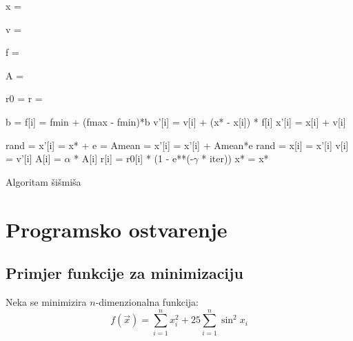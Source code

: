 \begin{algorithm}[H]
	\begin{algorithmic}[1]
		
\State x = 

\State v = 

\State f = 
  
\State A = 
  
  \State r0 = r =  

  
  
                
                \State b = 
                \State f[i] = fmin + (fmax - fmin)*b
                \State v'[i] = v[i] + (x* - x[i]) * f[i]
                \State x'[i] = x[i] + v[i] 

                \State rand = 
                \State x'[i] = x* + 
                \EndIf
                \State e = 
                \State Amean =  
                \State x'[i] = x'[i] + Amean*e 
                \State rand = 
                    \State x[i] = x'[i] 
                    \State v[i] = v'[i]
                    \State A[i] = $\alpha$ * A[i]
                    \State r[i] = r0[i] * (1 - e**(-$\gamma$ * iter))
                \EndIf
                \EndFor
		\State x* = 
		\EndFor
		\State \Return x*	
		\EndFunction
	\end{algorithmic}
	\caption{Algoritam šišmiša}
\end{algorithm}







\section{Programsko ostvarenje}
\subsection{Primjer funkcije za minimizaciju}
Neka se minimizira $n$-dimenzionalna funkcija:
\begin{equation}
    f(\vec{x}) = \sum_{i = 1}^{n}x_i^2 + 25\sum_{i = 1}^{n}\sin^2{x_i} \label{eq:fx}
\end{equation}



